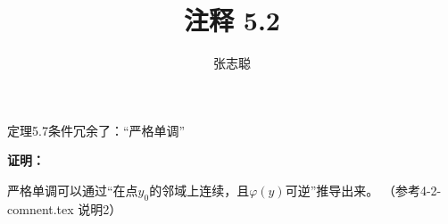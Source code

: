 \documentclass{article}
\begin{document}
\title{注释 5.2}
\author{张志聪}
\maketitle
\begin{zremark}
  定理5.7条件冗余了：“严格单调”
\end{zremark}

\textbf{证明：}

严格单调可以通过“在点$y_0$的邻域上连续，且$\varphi(y)$可逆”推导出来。
（参考4-2-comnent.tex 说明2）
\end{document}
